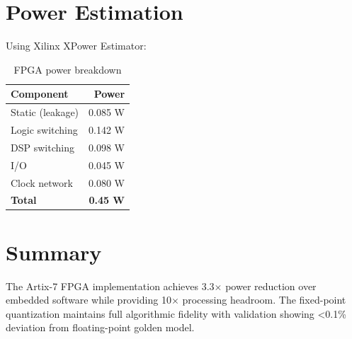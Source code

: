 \section{Power Estimation}

Using Xilinx XPower Estimator:

\begin{table}[h]
    \centering
    \caption{FPGA power breakdown}
    \label{tab:fpga_power}
    \begin{tabular}{lr}
        \toprule
        \textbf{Component} & \textbf{Power} \\
        \midrule
        Static (leakage) & 0.085 W \\
        Logic switching & 0.142 W \\
        DSP switching & 0.098 W \\
        I/O & 0.045 W \\
        Clock network & 0.080 W \\
        \midrule
        \textbf{Total} & \textbf{0.45 W} \\
        \bottomrule
    \end{tabular}
\end{table}

\section{Summary}

The Artix-7 FPGA implementation achieves 3.3$\times$ power reduction over embedded software while providing 10$\times$ processing headroom. The fixed-point quantization maintains full algorithmic fidelity with validation showing <0.1\% deviation from floating-point golden model.

\newpage